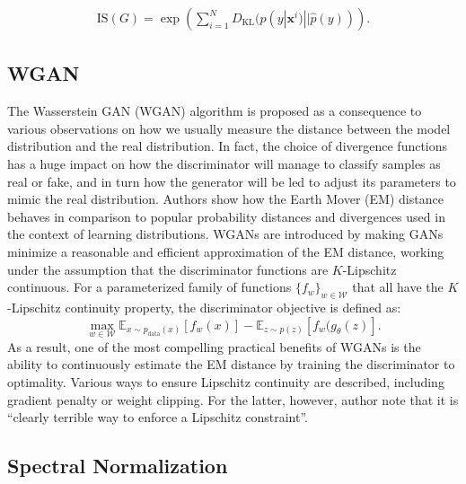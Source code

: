 \begin{equation}
\label{eq_IS2}
\begin{split}
\text{IS}(G) = \exp\left(\sum^N_{i=1}D_{\mathrm{KL}}(p(y|\bm{x}^i)||\hat{p}(y))\right).
\end{split}
\end{equation}


\subsection{WGAN}
The Wasserstein GAN (WGAN) algorithm is proposed as a consequence to various  observations on how we usually measure the distance between the model distribution and the real distribution. In fact, the choice of divergence functions has a huge impact on how the discriminator will manage to classify samples as real or fake, and in turn how the generator will be led to adjust its parameters to mimic the real distribution. Authors show how the Earth Mover (EM) distance behaves in comparison to popular probability distances and divergences used in the context of learning distributions. WGANs are introduced by making GANs minimize a reasonable and efficient approximation of the EM distance, working under the assumption that the discriminator functions are $K$-Lipschitz continuous. For a parameterized family of functions $\{ f_w \}_{w \in \mathcal{W}}$ that all have the $K$-Lipschitz continuity property, the discriminator objective is defined as:
\begin{equation} \label{eq:wgan}
\max_{w \in \mathcal{W}} \mathbb{E}_{x \sim p_{\text{data}}(x)}[f_w(x)] -
\mathbb{E}_{z \sim p(z)} [f_w(g_\theta (z)].
\end{equation}
As a result, one of the most compelling practical benefits of WGANs is the ability to continuously estimate the EM distance by training the discriminator to optimality. Various ways to ensure Lipschitz continuity are described, including gradient penalty or weight clipping. For the latter, however, author note that it is ``clearly terrible way to enforce a Lipschitz constraint''.

\subsection{Spectral Normalization}
\label{sec:bg-sn}


